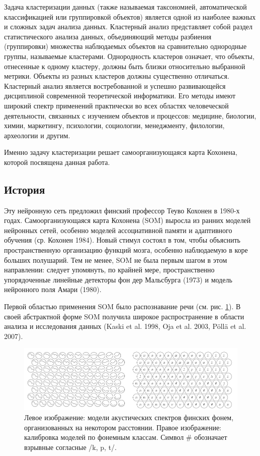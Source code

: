 \documentclass[a4paper,12pt]{article}
\begin{document}
Задача кластеризации данных (также называемая таксономией, автоматической классификацией или группировкой объектов) является одной из наиболее важных и сложных задач анализа данных. Кластерный анализ представляет собой раздел статистического анализа данных, объединяющий методы разбиения (группировки) множества наблюдаемых объектов на сравнительно однородные группы, называемые кластерами. Однородность кластеров означает, что объекты, отнесенные к одному кластеру, должны быть близки относительно выбранной метрики. Объекты из разных кластеров должны существенно отличаться. Кластерный анализ является востребованной и успешно развивающейся дисциплиной современной теоретической информатики. Его методы имеют широкий спектр применений практически во всех областях человеческой деятельности, связанных с изучением объектов и процессов: медицине, биологии, химии, маркетингу, психологии, социологии, менеджменту, филологии, археологии и другим.\cite{intro2}

Именно задачу кластеризации решает самоорганизующаяся карта Кохонена, которой посвящена данная работа.

\subsection{История}

Эту нейронную сеть предложил финский профессор Теуво Кохонен в 1980-х годах. Самоорганизующаяся карта Кохонена (SOM) выросла из ранних моделей нейронных сетей, особенно моделей ассоциативной памяти и адаптивного обучения (ср. Кохонен 1984). Новый стимул состоял в том, чтобы объяснить пространственную организацию функций мозга, особенно наблюдаемую в коре больших полушарий. Тем не менее, SOM не была первым шагом в этом направлении: следует упомянуть, по крайней мере, пространственно упорядоченные линейные детекторы фон дер Мальсбурга (1973) и модель нейронного поля Амари (1980).

Первой областью применения SOM было распознавание речи (см. рис. \ref{fig:phonemesom}). В своей абстрактной форме SOM получила широкое распространение в области анализа и исследования данных (Kaski et al. 1998, Oja et al. 2003, Pöllä et al. 2007).\cite{scholarpedia}

\begin{figure}[H]
  \centering
  \includegraphics[width=1\textwidth]{Phonemesom.png}
  \caption{Левое изображение: модели акустических спектров финских фонем, организованных на некотором расстоянии.
  Правое изображение: калибровка моделей по фонемным классам. Символ \# обозначает взрывные согласные /k, p, t/.}
  \label{fig:phonemesom}
\end{figure}
\end{document}
